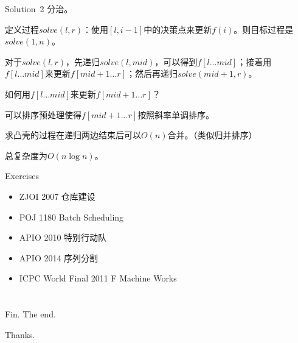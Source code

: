 \documentclass[9pt,dvipsnames,table,UTF8,aspectratio=169]{beamer}
\begin{document}
\begin{frame}{Solution\ 2}
	分治。

	\pause
	定义过程$solve(l, r)$：使用$[l, i - 1]$中的决策点来更新$f(i)$。则目标过程是$solve(1, n)$。
	
	对于$solve(l, r)$，先递归$solve(l, mid)$，可以得到$f[l \dots mid]$；接着用$f[l \dots mid]$来更新$f[mid + 1 \dots r]$；然后再递归$solve(mid + 1, r)$。

	\pause
	如何用$f[l \dots mid]$来更新$f[mid + 1 \dots r]$？

	可以排序预处理使得$f[mid + 1 \dots r]$按照斜率单调排序。

	求凸壳的过程在递归两边结束后可以$O(n)$合并。（类似归并排序）

	总复杂度为$O(n\log{n})$。
\end{frame}

\begin{frame}{Exercises}
	\begin{itemize}
		\item ZJOI 2007 仓库建设
		\item POJ 1180 Batch Scheduling
		\item APIO 2010 特别行动队
		\item APIO 2014 序列分割
		\item ICPC World Final 2011 F Machine Works
	\end{itemize}
\end{frame}
\appendix
\section{}
\begin{frame}{Fin.}
	The end.

	Thanks.
\end{frame}
\end{document}

